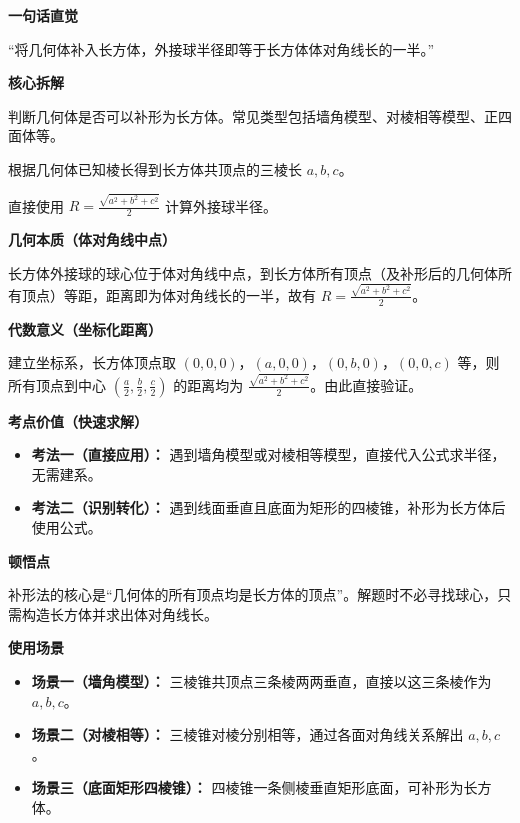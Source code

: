 \begin{explanationbox}
	\textbf{\textcolor{CExplanation}{一句话直觉}}

	“将几何体补入长方体，外接球半径即等于长方体体对角线长的一半。”

	\medskip
	\textbf{\textcolor{CExplanation}{核心拆解}}
	\begin{description}[style=nextline, leftmargin=2.8em, labelsep=0.5em, itemsep=0.45em]
		\item[\textbf{要点一（识别可补形）：}] 判断几何体是否可以补形为长方体。常见类型包括墙角模型、对棱相等模型、正四面体等。
		\item[\textbf{要点二（确定棱长）：}] 根据几何体已知棱长得到长方体共顶点的三棱长 $a,b,c$。
		\item[\textbf{要点三（代入公式）：}] 直接使用 $R = \frac{\sqrt{a^{2}+b^{2}+c^{2}}}{2}$ 计算外接球半径。
	\end{description}

	\medskip
	\textbf{\textcolor{CExplanation}{几何本质（体对角线中点）}}

	长方体外接球的球心位于体对角线中点，到长方体所有顶点（及补形后的几何体所有顶点）等距，距离即为体对角线长的一半，故有 $R = \frac{\sqrt{a^{2}+b^{2}+c^{2}}}{2}$。

	\medskip
	\textbf{\textcolor{CExplanation}{代数意义（坐标化距离）}}

	建立坐标系，长方体顶点取 $(0,0,0)$，$(a,0,0)$，$(0,b,0)$，$(0,0,c)$ 等，则所有顶点到中心 $(\frac{a}{2},\frac{b}{2},\frac{c}{2})$ 的距离均为 $\frac{\sqrt{a^{2}+b^{2}+c^{2}}}{2}$。由此直接验证。

	\medskip
	\textbf{\textcolor{CExplanation}{考点价值（快速求解）}}
	\begin{itemize}[leftmargin=*, itemsep=0.5em, topsep=0.4em]
		\item \textbf{考法一（直接应用）：} 遇到墙角模型或对棱相等模型，直接代入公式求半径，无需建系。
		\item \textbf{考法二（识别转化）：} 遇到线面垂直且底面为矩形的四棱锥，补形为长方体后使用公式。
	\end{itemize}

	\medskip
	\textbf{\textcolor{CExplanation}{顿悟点}}

	补形法的核心是“几何体的所有顶点均是长方体的顶点”。解题时不必寻找球心，只需构造长方体并求出体对角线长。

	\medskip
	\textbf{\textcolor{CExplanation}{使用场景}}
	\begin{itemize}[leftmargin=*, itemsep=0.5em, topsep=0.4em]
		\item \textbf{场景一（墙角模型）：} 三棱锥共顶点三条棱两两垂直，直接以这三条棱作为 $a,b,c$。
		\item \textbf{场景二（对棱相等）：} 三棱锥对棱分别相等，通过各面对角线关系解出 $a,b,c$。
		\item \textbf{场景三（底面矩形四棱锥）：} 四棱锥一条侧棱垂直矩形底面，可补形为长方体。
	\end{itemize}
\end{explanationbox}
